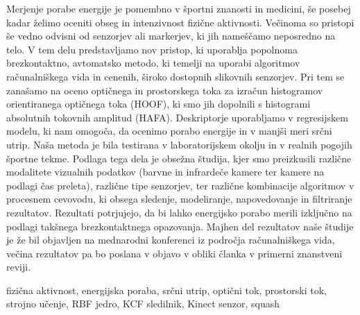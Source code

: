 \povzetek
Merjenje porabe energije je pomembno v športni znanosti in medicini, še posebej kadar želimo oceniti obseg in intenzivnost fizične aktivnosti. Večinoma so pristopi še vedno odvisni od senzorjev ali markerjev, ki jih nameščamo neposredno na telo. V tem delu predstavljamo nov pristop, ki uporablja popolnoma brezkontaktno, avtomatsko metodo, ki temelji na uporabi algoritmov računalniškega vida in cenenih, široko dostopnih slikovnih senzorjev. Pri tem se zanašamo na oceno optičnega in prostorskega toka za izračun histogramov orientiranega optičnega toka (HOOF), ki smo jih dopolnili s histogrami absolutnih tokovnih amplitud (HAFA). Deskriptorje uporabljamo v regresijskem modelu, ki nam omogoča, da ocenimo porabo energije in v manjši meri srčni utrip. Naša metoda je bila testirana v laboratorijskem okolju in v realnih pogojih športne tekme. Podlaga tega dela je obsežna študija, kjer smo preizkusili različne modalitete vizualnih podatkov (barvne in infrardeče kamere ter kamere na podlagi čas preleta), različne tipe senzorjev, ter različne kombinacije algoritmov v procesnem cevovodu, ki obsega sledenje, modeliranje, napovedovanje in filtriranje rezultatov.
Rezultati potrjujejo, da bi lahko energijsko porabo merili izključno na podlagi takšnega brezkontaktnega opazovanja. Majhen del rezultatov naše študije je že bil objavljen na mednarodni konferenci iz področja računalniškega vida, večina rezultatov pa bo poslana v objavo v obliki članka v primerni znanstveni reviji.

\kljucnebesede fizična aktivnost, energijska poraba, srčni utrip, optični tok, prostorski tok, strojno učenje, RBF jedro, KCF sledilnik, Kinect senzor, squash